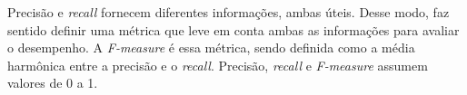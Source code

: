 \par Precisão e \textit{recall} fornecem diferentes informações, ambas 
úteis. Desse modo, faz sentido definir uma métrica que leve em conta ambas as
informações para avaliar o desempenho. A \textit{F-measure} é essa métrica, sendo
definida como a média harmônica entre a precisão e o \textit{recall}. Precisão,
\textit{recall} e \textit{F-measure} assumem valores de 0 a 1.

